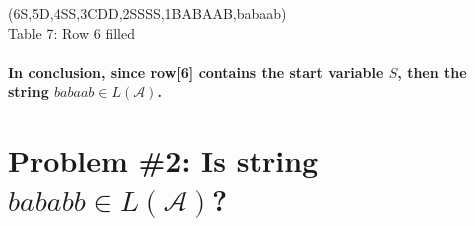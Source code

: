 \documentclass[12pt]{article}
\begin{document}
\begin{center}
    \young(6S,5D\emptyset,4S\emptyset S,3CDD\emptyset,2SSS\emptyset S,1BABAAB,\hfill babaab) \\
    Table 7: Row 6 filled
\end{center}

\paragraph{In conclusion, since row[6] contains the start variable $S$, then the string $babaab \in L(\mathcal{A})$.}
\clearpage
\section*{Problem \#2: Is string $bababb \in L(\mathcal{A})$?}
\end{document}
